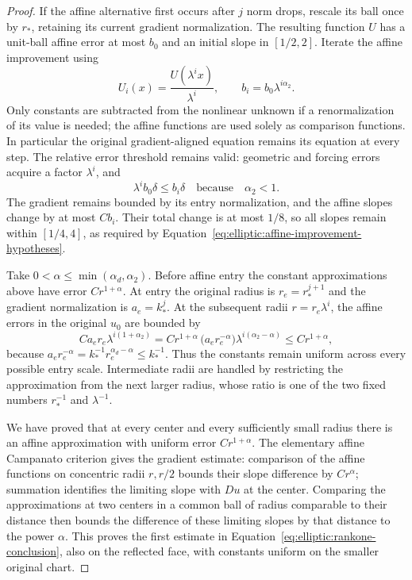 \begin{proof}
If the affine alternative first occurs after $j$ norm drops, rescale its
ball once by $r_*$, retaining its current gradient normalization.
The resulting function $U$ has a unit-ball affine error at most $b_0$
and an initial slope in $[1/2,2]$.  Iterate the affine improvement using
\[
 U_i(x)=\frac{U(\lambda^i x)}{\lambda^i},
 \qquad b_i=b_0\lambda^{i\alpha_2}.
\]
Only constants are subtracted from the nonlinear unknown if a
renormalization of its value is needed; the affine functions are used
solely as comparison functions.  In particular the original
gradient-aligned equation remains its equation at every step.
The relative error threshold remains valid: geometric and forcing
errors acquire a factor $\lambda^i$, and
\[
 \lambda^i b_0\delta\leq b_i\delta
 \quad\text{because}\quad\alpha_2<1.
\]
The gradient remains bounded by its entry normalization, and the affine
slopes change by at most $Cb_i$.  Their total change is at most $1/8$,
so all slopes remain within $[1/4,4]$, as required by
Equation~\eqref{eq:elliptic:affine-improvement-hypotheses}.

Take $0<\alpha\leq\min(\alpha_d,\alpha_2)$.  Before affine entry the
constant approximations above have error $Cr^{1+\alpha}$.  At entry the
original radius is $r_e=r_*^{j+1}$ and the gradient normalization is
$a_e=k_*^j$.  At the subsequent radii $r=r_e\lambda^i$, the affine
errors in the original $u_0$ are bounded by
\[
 C a_e r_e\lambda^{i(1+\alpha_2)}
  =C r^{1+\alpha}\,
      \bigl(a_e r_e^{-\alpha}\bigr)
       \lambda^{i(\alpha_2-\alpha)}
  \leq C r^{1+\alpha},
\]
because
$a_e r_e^{-\alpha}=k_*^{-1}r_e^{\alpha_d-\alpha}\leq k_*^{-1}$.
Thus the constants remain uniform across every possible entry scale.
Intermediate radii are handled by restricting the approximation from
the next larger radius, whose ratio is one of the two fixed numbers
$r_*^{-1}$ and $\lambda^{-1}$.

We have proved that at every center and every sufficiently small radius
there is an affine approximation with uniform error $Cr^{1+\alpha}$.
The elementary affine Campanato criterion gives the gradient estimate:
comparison of the affine functions on concentric radii $r,r/2$ bounds
their slope difference by $Cr^\alpha$; summation identifies the limiting
slope with $Du$ at the center.  Comparing the approximations at two
centers in a common ball of radius comparable to their distance then
bounds the difference of these limiting slopes by that distance to the
power $\alpha$.  This proves the first estimate in
Equation~\eqref{eq:elliptic:rankone-conclusion}, also on the reflected
face, with constants uniform on the smaller original chart.


\end{proof}
